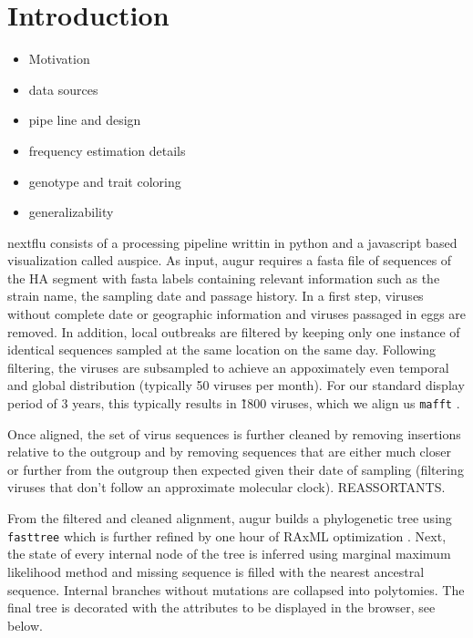 \documentclass{bioinfo}
\begin{document}
\section*{Introduction}

\begin{itemize}
	\item Motivation
	\item data sources
	\item pipe line and design
	\item frequency estimation details
	\item genotype and trait coloring
	\item generalizability
\end{itemize}

nextflu consists of a processing pipeline writtin in python and a javascript based visualization called auspice.
As input, augur requires a fasta file of sequences of the HA segment with fasta labels containing relevant information such as the strain name, the sampling date and passage history.
In a first step, viruses without complete date  or geographic information and viruses passaged in eggs are removed.
In addition, local outbreaks are filtered by keeping only one instance of identical sequences sampled at the same location on the same day.
Following filtering, the viruses are subsampled to achieve an appoximately even temporal and global distribution (typically 50 viruses per month).
For our standard display period of 3 years, this typically results in \~1800 viruses, which we align us \texttt{mafft} \citep{mafft}.

Once aligned, the set of virus sequences is further cleaned by removing insertions relative to the outgroup and by removing sequences that are either much closer or further from the outgroup then expected given their date of sampling (filtering viruses that don't follow an approximate molecular clock).
REASSORTANTS.

From the filtered and cleaned alignment, augur builds a phylogenetic tree using \texttt{fasttree} \citep{Price:2009p47657} which is further refined by one hour of RAxML optimization \citep{RAxml}.
Next, the state of every internal node of the tree is inferred using marginal maximum likelihood method and missing sequence is filled with the nearest ancestral sequence.
Internal branches without mutations are collapsed into polytomies.
The final tree is decorated with the attributes to be displayed in the browser, see below.  
\end{document}
